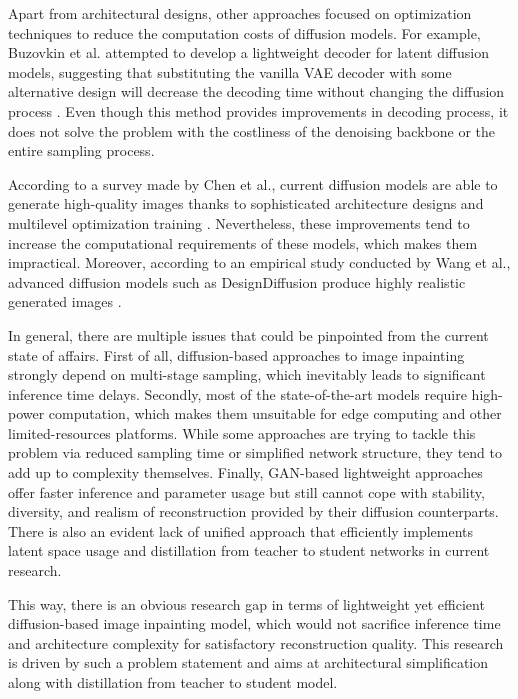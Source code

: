\documentclass[journal]{IEEEtran}
\begin{document}
Apart from architectural designs, other approaches focused on optimization techniques to reduce the computation costs of diffusion models. For example, Buzovkin et al. attempted to develop a lightweight decoder for latent diffusion models, suggesting that substituting the vanilla VAE decoder with some alternative design will decrease the decoding time without changing the diffusion process \cite{buzovkin2025decoder}. Even though this method provides improvements in decoding process, it does not solve the problem with the costliness of the denoising backbone or the entire sampling process.

According to a survey made by Chen et al., current diffusion models are able to generate high-quality images thanks to sophisticated architecture designs and multilevel optimization training \cite{chen2024survey}. Nevertheless, these improvements tend to increase the computational requirements of these models, which makes them impractical. Moreover, according to an empirical study conducted by Wang et al., advanced diffusion models such as DesignDiffusion produce highly realistic generated images \cite{wang2025designdiffusion}.

In general, there are multiple issues that could be pinpointed from the current state of affairs. First of all, diffusion-based approaches to image inpainting strongly depend on multi-stage sampling, which inevitably leads to significant inference time delays. Secondly, most of the state-of-the-art models require high-power computation, which makes them unsuitable for edge computing and other limited-resources platforms. While some approaches are trying to tackle this problem via reduced sampling time or simplified network structure, they tend to add up to complexity themselves. Finally, GAN-based lightweight approaches offer faster inference and parameter usage but still cannot cope with stability, diversity, and realism of reconstruction provided by their diffusion counterparts. There is also an evident lack of unified approach that efficiently implements latent space usage and distillation from teacher to student networks in current research.

This way, there is an obvious research gap in terms of lightweight yet efficient diffusion-based image inpainting model, which would not sacrifice inference time and architecture complexity for satisfactory reconstruction quality. This research is driven by such a problem statement and aims at architectural simplification along with distillation from teacher to student model.
\end{document}
